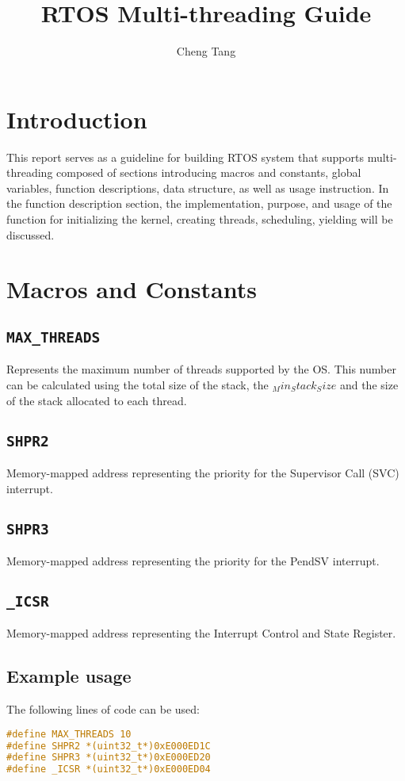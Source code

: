 \documentclass{article}
\title{RTOS Multi-threading Guide}
\author{Cheng Tang}
\begin{document}
\maketitle

\section{Introduction}

This report serves as a guideline for building RTOS system that supports multi-threading composed of sections introducing macros and constants, global variables, function descriptions, data structure, as well as usage instruction. In the function description section, the implementation, purpose, and usage of the function for initializing the kernel, creating threads, scheduling, yielding will be discussed. 

\section{Macros and Constants}

\subsection{\texttt{MAX\_THREADS}}
Represents the maximum number of threads supported by the OS. This number can be calculated using the total size of the stack, the $_Min_Stack_Size$ and the size of the stack allocated to each thread.

\subsection{\texttt{SHPR2}}
Memory-mapped address representing the priority for the Supervisor Call (SVC) interrupt.

\subsection{\texttt{SHPR3}}
Memory-mapped address representing the priority for the PendSV interrupt.

\subsection{\texttt{\_ICSR}}
Memory-mapped address representing the Interrupt Control and State Register.

\subsection{Example usage}
The following lines of code can be used:
\begin{lstlisting}[language=C]
#define MAX_THREADS 10
#define SHPR2 *(uint32_t*)0xE000ED1C
#define SHPR3 *(uint32_t*)0xE000ED20
#define _ICSR *(uint32_t*)0xE000ED04
\end{lstlisting}
\end{document}
